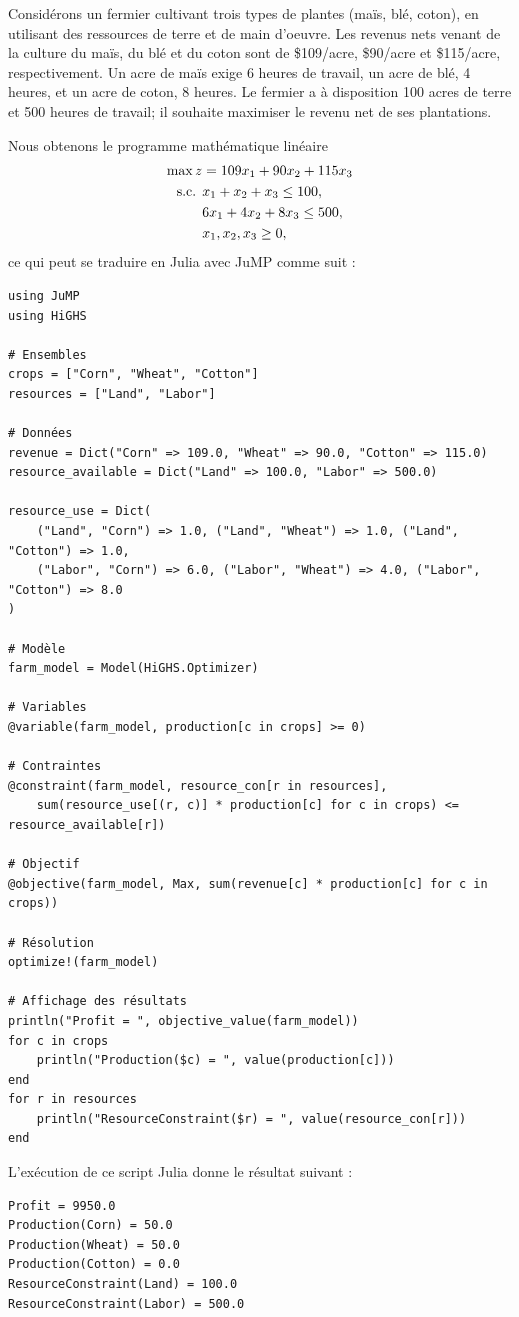 \begin{example}
Considérons un fermier cultivant trois types de plantes (maïs, blé, coton), en utilisant des ressources de terre et de main d'oeuvre.
Les revenus nets venant de la culture du maïs, du blé et du coton sont de \$109/acre, \$90/acre et \$115/acre, respectivement.
Un acre de maïs exige 6 heures de travail, un acre de blé, 4 heures, et un acre de coton, 8 heures.
Le fermier a à disposition 100 acres de terre et 500 heures de travail; il souhaite maximiser le revenu net de ses plantations.

Nous obtenons le programme mathématique linéaire
\begin{align*}
\max z &= 109x_1+90x_2+115x_3 \\
\mbox{s.c. } & x_1 + x_2 + x_3 \leq 100, \\
& 6x_1 + 4x_2 + 8x_3 \leq 500, \\
& x_1, x_2, x_3 \geq 0,
\end{align*}
ce qui peut se traduire en Julia avec JuMP comme suit :
\begin{verbatim}
using JuMP
using HiGHS

# Ensembles
crops = ["Corn", "Wheat", "Cotton"]
resources = ["Land", "Labor"]

# Données
revenue = Dict("Corn" => 109.0, "Wheat" => 90.0, "Cotton" => 115.0)
resource_available = Dict("Land" => 100.0, "Labor" => 500.0)

resource_use = Dict(
    ("Land", "Corn") => 1.0, ("Land", "Wheat") => 1.0, ("Land", "Cotton") => 1.0,
    ("Labor", "Corn") => 6.0, ("Labor", "Wheat") => 4.0, ("Labor", "Cotton") => 8.0
)

# Modèle
farm_model = Model(HiGHS.Optimizer)

# Variables
@variable(farm_model, production[c in crops] >= 0)

# Contraintes
@constraint(farm_model, resource_con[r in resources],
    sum(resource_use[(r, c)] * production[c] for c in crops) <= resource_available[r])

# Objectif
@objective(farm_model, Max, sum(revenue[c] * production[c] for c in crops))

# Résolution
optimize!(farm_model)

# Affichage des résultats
println("Profit = ", objective_value(farm_model))
for c in crops
    println("Production($c) = ", value(production[c]))
end
for r in resources
    println("ResourceConstraint($r) = ", value(resource_con[r]))
end
\end{verbatim}
L'exécution de ce script Julia donne le résultat suivant :
\begin{verbatim}
Profit = 9950.0
Production(Corn) = 50.0
Production(Wheat) = 50.0
Production(Cotton) = 0.0
ResourceConstraint(Land) = 100.0
ResourceConstraint(Labor) = 500.0
\end{verbatim}


\end{example}
